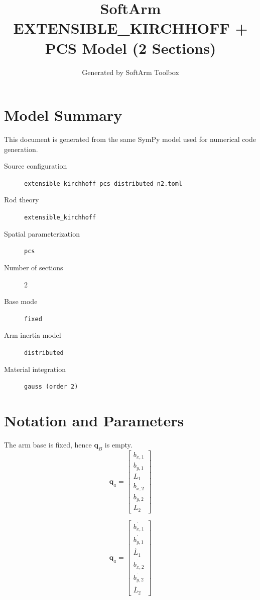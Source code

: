 \documentclass[11pt]{article}
\title{SoftArm EXTENSIBLE\_KIRCHHOFF + PCS Model (2 Sections)}
\author{Generated by SoftArm Toolbox}
\date{}
\begin{document}
\maketitle

\section{Model Summary}
This document is generated from the same SymPy model used for numerical code generation.
\begin{description}
\item[Source configuration] \texttt{extensible\_kirchhoff\_pcs\_distributed\_n2.toml}
\item[Rod theory] \texttt{extensible\_kirchhoff}
\item[Spatial parameterization] \texttt{pcs}
\item[Number of sections] 2
\item[Base mode] \texttt{fixed}
\item[Arm inertia model] \texttt{distributed}
\item[Material integration] \texttt{gauss (order 2)}
\end{description}

\section{Notation and Parameters}
The arm base is fixed, hence $\boldsymbol q_B$ is empty.
\begin{equation}
\boldsymbol q_a=\begin{bmatrix}b_{x,1}\\b_{y,1}\\L_{1}\\b_{x,2}\\b_{y,2}\\L_{2}\end{bmatrix}
\end{equation}

\begin{equation}
\dot{\boldsymbol q}_a=\begin{bmatrix}\dot{b_{x,1}}\\\dot{b_{y,1}}\\\dot{L_{1}}\\\dot{b_{x,2}}\\\dot{b_{y,2}}\\\dot{L_{2}}\end{bmatrix}
\end{equation}
\end{document}

